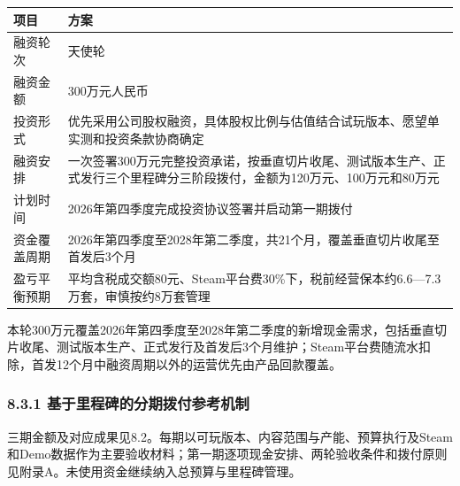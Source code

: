 \documentclass[UTF8,fontset=none,zihao=5,twoside]{ctexart}
\newcounter{none}
\newenvironment{BusinessTable}{%
  \begingroup
  \small
  \setlength{\parindent}{0pt}%
  \setlength{\parskip}{0pt}%
  \rowcolors{2}{TableAlt}{white}%
}{%
  \endgroup
}
\begin{document}
\begin{BusinessTable}

{\def\LTcaptype{none} %
\begin{longtable}[]{@{}
  >{\raggedright\arraybackslash}p{}
  >{\raggedright\arraybackslash}p{}@{}}
\toprule\noalign{}
\begin{minipage}[b]{\linewidth}\raggedright
\cellcolor{TableHeader}\color{BrandBlue}\bfseries 项目
\end{minipage} & \begin{minipage}[b]{\linewidth}\raggedright
\cellcolor{TableHeader}\color{BrandBlue}\bfseries 方案
\end{minipage} \\
\midrule\noalign{}
\endhead
\bottomrule\noalign{}
\endlastfoot
融资轮次 & 天使轮 \\
融资金额 & 300万元人民币 \\
投资形式 & 优先采用公司股权融资，具体股权比例与估值结合试玩版本、愿望单实测和投资条款协商确定 \\
融资安排 & 一次签署300万元完整投资承诺，按垂直切片收尾、测试版本生产、正式发行三个里程碑分三阶段拨付，金额为120万元、100万元和80万元 \\
计划时间 & 2026年第四季度完成投资协议签署并启动第一期拨付 \\
资金覆盖周期 & 2026年第四季度至2028年第二季度，共21个月，覆盖垂直切片收尾至首发后3个月 \\
盈亏平衡预期 & 平均含税成交额80元、Steam平台费30\%下，税前经营保本约6.6---7.3万套，审慎按约8万套管理 \\
\end{longtable}
}

\end{BusinessTable}

本轮300万元覆盖2026年第四季度至2028年第二季度的新增现金需求，包括垂直切片收尾、测试版本生产、正式发行及首发后3个月维护；Steam平台费随流水扣除，首发12个月中融资周期以外的运营优先由产品回款覆盖。

\subsubsection{8.3.1 基于里程碑的分期拨付参考机制}\label{831-ux57faux4e8eux91ccux7a0bux7891ux7684ux5206ux671fux62e8ux4ed8ux53c2ux8003ux673aux5236}

三期金额及对应成果见8.2。每期以可玩版本、内容范围与产能、预算执行及Steam和Demo数据作为主要验收材料；第一期逐项现金安排、两轮验收条件和拨付原则见附录A。未使用资金继续纳入总预算与里程碑管理。
\end{document}
